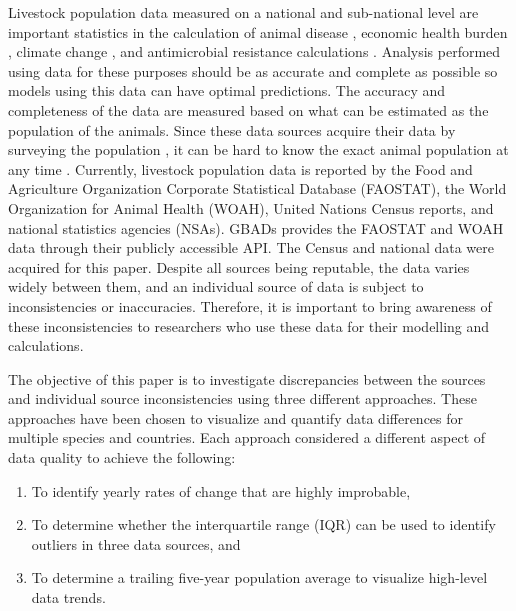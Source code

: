 \documentclass{article}
\begin{document}
Livestock population data measured on a national and sub-national level are important statistics in the calculation of animal disease \citep{sibhat_bovine_2017}, economic health burden \citep{muraguri_cost_1998}, climate change \citep{geoffry_fordyce_australian_nodate}, and antimicrobial resistance calculations \citep{mulchandani_global_2023}. Analysis performed using data for these purposes should be as accurate and complete as possible so models using this data can have optimal predictions. The accuracy and completeness of the data \citep{penell_validation_2008} are measured based on what can be estimated as the population of the animals. Since these data sources acquire their data by surveying the population \citep{world_organization_for_animal_health_world_nodate}, it can be hard to know the exact animal population at any time \citep{world_organization_for_animal_health_world_nodate}. Currently, livestock population data is reported by the Food and Agriculture Organization Corporate Statistical Database (FAOSTAT), the World Organization for Animal Health (WOAH), United Nations Census reports, and national statistics agencies (NSAs). GBADs provides the FAOSTAT and WOAH data through their publicly accessible API. The Census \cite{WorldCensusOne} \cite{WorldCensusTwo} and national data \cite{USDA} were acquired for this paper. Despite all sources being reputable, the data varies widely between them, and an individual source of data is subject to inconsistencies or inaccuracies. Therefore, it is important to bring awareness of these inconsistencies to researchers who use these data for their modelling and calculations. 

The objective of this paper is to investigate discrepancies between the sources and individual source inconsistencies using three different approaches. These approaches have been chosen to visualize and quantify data differences for multiple species and countries. Each approach considered a different aspect of data quality to achieve the following: 

\begin{enumerate}
\item To identify yearly rates of change that are highly improbable,
\item To determine whether the interquartile range (IQR) can be used to identify outliers in three data sources, and
\item To determine a trailing five-year population average to visualize high-level data trends.
\end{enumerate}
\end{document}
